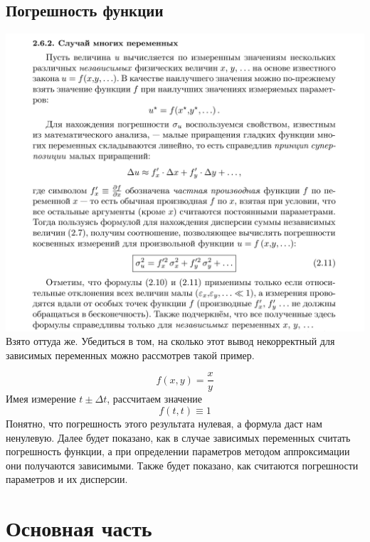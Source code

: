 \documentclass[a4paper,12pt]{article}
\begin{document}
\subsection{Погрешность функции}
\includegraphics[width=0.8\paperwidth, center]{погрешность_функции.png}
Взято оттуда же.
Убедиться в том, на сколько этот вывод некорректный для зависимых переменных можно рассмотрев такой пример.

\[ f(x, y) = \frac{x}{y} \]
Имея измерение $t \pm \Delta t$, рассчитаем значение
\[ f(t, t) \equiv 1 \]
Понятно, что погрешность этого результата нулевая, а формула даст нам
ненулевую. Далее будет показано, как в случае зависимых переменных считать погрешность
функции, а при определении параметров методом аппроксимации они получаются зависимыми.
Также будет показано, как считаются погрешности параметров и их дисперсии.


\section{Основная часть}
\end{document}

